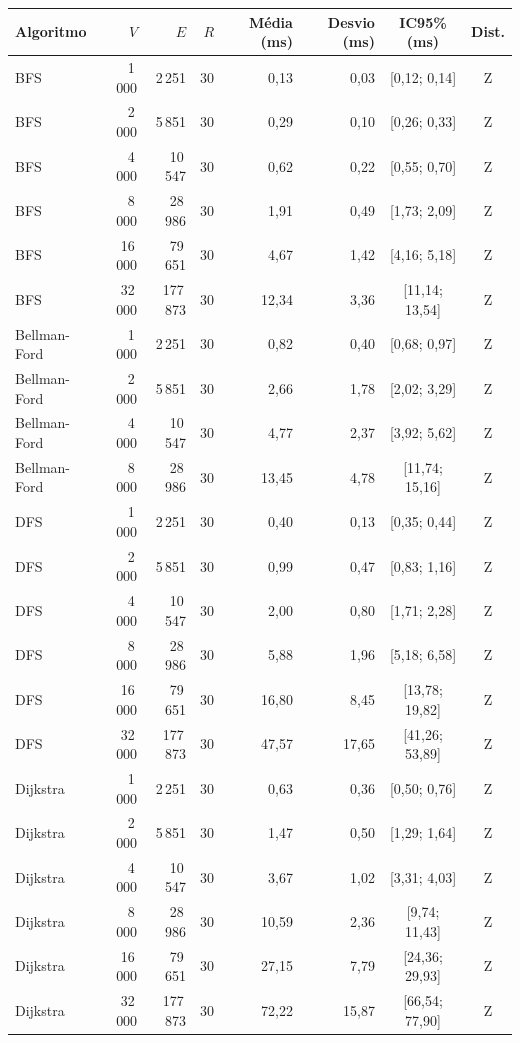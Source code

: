 \begin{tabular}{lrrrrrcc}
    \toprule
    Algoritmo & $V$ & $E$ & $R$ & Média (ms) & Desvio (ms) & IC95\% (ms) & Dist. \\
    \midrule
    BFS & 1\,000 & 2\,251 & 30 & 0,13 & 0,03 & [0,12; 0,14] & Z \\
    BFS & 2\,000 & 5\,851 & 30 & 0,29 & 0,10 & [0,26; 0,33] & Z \\
    BFS & 4\,000 & 10\,547 & 30 & 0,62 & 0,22 & [0,55; 0,70] & Z \\
    BFS & 8\,000 & 28\,986 & 30 & 1,91 & 0,49 & [1,73; 2,09] & Z \\
    BFS & 16\,000 & 79\,651 & 30 & 4,67 & 1,42 & [4,16; 5,18] & Z \\
    BFS & 32\,000 & 177\,873 & 30 & 12,34 & 3,36 & [11,14; 13,54] & Z \\
    Bellman-Ford & 1\,000 & 2\,251 & 30 & 0,82 & 0,40 & [0,68; 0,97] & Z \\
    Bellman-Ford & 2\,000 & 5\,851 & 30 & 2,66 & 1,78 & [2,02; 3,29] & Z \\
    Bellman-Ford & 4\,000 & 10\,547 & 30 & 4,77 & 2,37 & [3,92; 5,62] & Z \\
    Bellman-Ford & 8\,000 & 28\,986 & 30 & 13,45 & 4,78 & [11,74; 15,16] & Z \\
    DFS & 1\,000 & 2\,251 & 30 & 0,40 & 0,13 & [0,35; 0,44] & Z \\
    DFS & 2\,000 & 5\,851 & 30 & 0,99 & 0,47 & [0,83; 1,16] & Z \\
    DFS & 4\,000 & 10\,547 & 30 & 2,00 & 0,80 & [1,71; 2,28] & Z \\
    DFS & 8\,000 & 28\,986 & 30 & 5,88 & 1,96 & [5,18; 6,58] & Z \\
    DFS & 16\,000 & 79\,651 & 30 & 16,80 & 8,45 & [13,78; 19,82] & Z \\
    DFS & 32\,000 & 177\,873 & 30 & 47,57 & 17,65 & [41,26; 53,89] & Z \\
    Dijkstra & 1\,000 & 2\,251 & 30 & 0,63 & 0,36 & [0,50; 0,76] & Z \\
    Dijkstra & 2\,000 & 5\,851 & 30 & 1,47 & 0,50 & [1,29; 1,64] & Z \\
    Dijkstra & 4\,000 & 10\,547 & 30 & 3,67 & 1,02 & [3,31; 4,03] & Z \\
    Dijkstra & 8\,000 & 28\,986 & 30 & 10,59 & 2,36 & [9,74; 11,43] & Z \\
    Dijkstra & 16\,000 & 79\,651 & 30 & 27,15 & 7,79 & [24,36; 29,93] & Z \\
    Dijkstra & 32\,000 & 177\,873 & 30 & 72,22 & 15,87 & [66,54; 77,90] & Z \\

\end{tabular}
